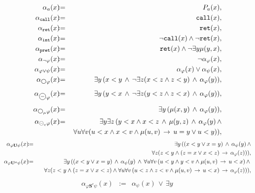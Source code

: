 \documentclass{LMCS}
\newcommand{\M}{{\mu}}
\newcommand{\dm}{\Diamond}
\newcommand{\U}{{\mathbf U}}
\renewcommand{\S}{{\mathbf S}}
\newcommand{\next}{\text{\raisebox{1pt}{$\bigcirc$}}}
\theoremstyle{plain}
\theoremstyle{definition}
\newcommand{\Sc}{\S^c}
\newcommand{\Ur}{\U^a}
\newcommand{\prev}{{\text{\Large $\mathbf{\circleddash}$}}}
\newcommand{\pret}{\tt{pret}}
\newcommand{\intt}{{\tt int}}
\newcommand{\rett}{{\tt ret}}
\newcommand{\call}{{\tt call}}
\newcommand{\dmm}{\dm_{\M}}
\newcommand{\dmminus}{\dm^-}
\renewcommand{\dm}{\next}
\renewcommand{\dmminus}{\prev}
\renewcommand{\dmm}{\dm_\M}
\begin{document}
{{\small
\begin{eqnarray*}
\alpha_a(x) &\!\!\!:=\!\!\!& P_a(x),\\
\alpha_\call(x) &\!\!\!:=\!\!\!& \call(x),\\
\alpha_\rett(x) &\!\!\!:=\!\!\!& \rett(x),\\
\alpha_\intt(x) &\!\!\!:=\!\!\!& \neg \call(x) \wedge \neg \rett(x),\\
\alpha_{\pret}(x) &\!\!\!:=\!\!\!& \rett(x) \wedge \neg \exists y \M(y,x),\\
\alpha_{\neg \varphi}(x) &\!\!\!:=\!\!\!& \neg \alpha_\varphi(x),\\
\alpha_{\varphi \vee \psi}(x) &\!\!\!:=\!\!\!& \alpha_\varphi(x) \vee
\alpha_\psi(x), \\
\alpha_{\dm \varphi}(x) &\!\!\!:=\!\!\!& \exists y\, (x < y \,\wedge \,\neg \exists z (x
< z \wedge z < y) \,\wedge\, \alpha_\varphi(y)),\\
\alpha_{\dmminus \varphi}(x) &\!\!\!:=\!\!\!& \exists y\, (y < x \,\wedge \,\neg \exists z (y
< z \wedge z < x) \,\wedge\, \alpha_\varphi(y)),\\
\alpha_{\dmm \varphi}(x) &\!\!\!:=\!\!\!& \exists y\, (\M(x,y) \,\wedge\,
\alpha_\varphi(y)),
\\
\alpha_{{\text{\small $\mathbf{\circleddash}$}}_c \varphi}(x) &\!\!\!:=\!\!\!& \exists y \exists z \, (y < x \wedge x
< z \,\wedge \, \M(y,z) \,\wedge\, 
\alpha_\varphi(y) \,\wedge\\ 
&& \ \ \forall u \forall v (u < x \wedge
x < v \wedge \M(u,v) \,\rightarrow\, u = y \vee u < y)),
\end{eqnarray*}
\begin{eqnarray*}
\alpha_{\varphi \Ul \psi}(x) &\!\!\!:=\!\!\!& \exists y\, ((x < y \vee x = y)
\,\wedge\, \alpha_\psi(y) \,\wedge\\ && \ \ \ \ \forall z (z < y \wedge (z = x
\vee x < z) \,\rightarrow\, \alpha_\varphi(z))),\\ 
\alpha_{\varphi \Ur \psi}(x) &\!\!\!:=\!\!\!& \exists y\, ((x < y \vee x = y)
\,\wedge\, \alpha_\psi(y) \,\wedge\, \forall u \forall v\,(u < y
\wedge y < v \wedge \M(u,v) \,\rightarrow\, u < x) \,\wedge\,  \\
&& \ \ \ \   
\forall z (z < y \wedge (z = x
\vee x < z) \wedge \forall u \forall v\,(u < z
\wedge z < v \wedge \M(u,v) \,\rightarrow\, u < x) \,\rightarrow\,
\alpha_\varphi(z))),
\end{eqnarray*}
\begin{eqnarray*}
\alpha_{\varphi \Sc \psi}(x) &\!\!\!:=\!\!\!& \alpha_\psi(x) \,\vee\, \exists y\,

\end{eqnarray*}}}
\end{document}
